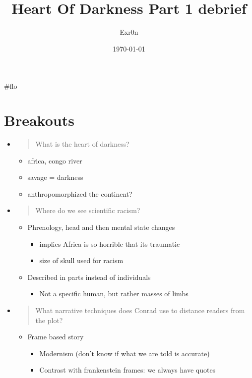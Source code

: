 \documentclass[letterpaper]{article}
\author{Exr0n}
\date{\today}
\title{Heart Of Darkness Part 1 debrief}
\renewcommand{\tableofcontents}{}
\begin{document}
\tableofcontents

\#flo

\section{Breakouts}
\label{sec:org2224cf3}
\begin{itemize}
\item \begin{quote}
What is the heart of darkness?
\end{quote}

\begin{itemize}
\item africa, congo river
\item savage = darkness
\item anthropomorphized the continent?
\end{itemize}

\item \begin{quote}
Where do we see scientific racism?
\end{quote}

\begin{itemize}
\item Phrenology, head and then mental state changes

\begin{itemize}
\item implies Africa is so horrible that its traumatic
\item size of skull used for racism
\end{itemize}

\item Described in parts instead of individuals

\begin{itemize}
\item Not a specific human, but rather masses of limbs
\end{itemize}
\end{itemize}

\item \begin{quote}
What narrative techniques does Conrad use to distance readers from
the plot?
\end{quote}

\begin{itemize}
\item Frame based story

\begin{itemize}
\item Modernism (don't know if what we are told is accurate)
\item Contrast with frankenstein frames: we always have quotes
\end{itemize}


\end{itemize}
\end{itemize}
\end{document}
